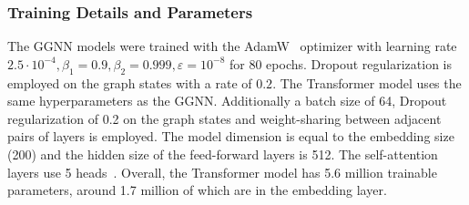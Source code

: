 \subsubsection{Training Details and Parameters}

The GGNN models were trained with the AdamW~\cite{Loshchilov2019}
optimizer with learning rate
$2.5\cdot 10^{-4}, \beta_1=0.9, \beta_2=0.999, \varepsilon=10^{-8}$
for 80 epochs. Dropout regularization is employed on the graph states
with a rate of $0.2$. The Transformer model uses the same
hyperparameters as the GGNN. Additionally a batch size of 64, Dropout
regularization of 0.2 on the graph states and weight-sharing between
adjacent pairs of layers is employed. The model dimension is equal to
the embedding size (200) and the hidden size of the feed-forward
layers is 512. The self-attention layers use 5
heads~\cite{Vaswani2017}. Overall, the Transformer model has 5.6
million trainable parameters, around 1.7 million of which are in the
embedding layer.
